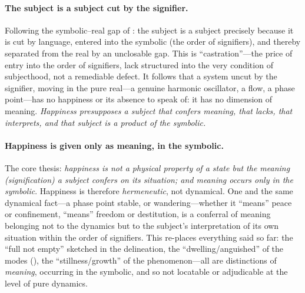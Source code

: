 \paragraph{The subject is a subject cut by the signifier.} Following the symbolic--real gap of : the subject is a subject precisely because it is cut by language, entered into the symbolic (the order of signifiers), and thereby separated from the real by an unclosable gap. This is ``castration''---the price of entry into the order of signifiers, lack structured into the very condition of subjecthood, not a remediable defect. It follows that a system uncut by the signifier, moving in the pure real---a genuine harmonic oscillator, a flow, a phase point---has no happiness or its absence to speak of: it has no dimension of meaning. \emph{Happiness presupposes a subject that confers meaning, that lacks, that interprets, and that subject is a product of the symbolic.}

\paragraph{Happiness is given only as meaning, in the symbolic.} The core thesis: \emph{happiness is not a physical property of a state but the meaning (signification) a subject confers on its situation; and meaning occurs only in the symbolic}. Happiness is therefore \emph{hermeneutic}, not dynamical. One and the same dynamical fact---a phase point stable, or wandering---whether it ``means'' peace or confinement, ``means'' freedom or destitution, is a conferral of meaning belonging not to the dynamics but to the subject's interpretation of its own situation within the order of signifiers. This re-places everything said so far: the ``full not empty'' sketched in the delineation, the ``dwelling/anguished'' of the modes (), the ``stillness/growth'' of the phenomenon---all are distinctions of \emph{meaning}, occurring in the symbolic, and so not locatable or adjudicable at the level of pure dynamics.

